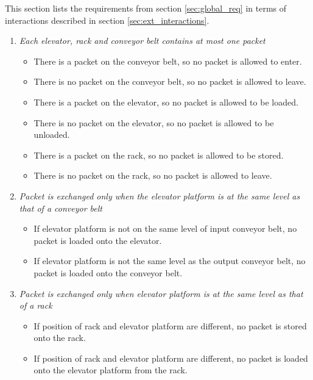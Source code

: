 
This section lists the requirements from section \ref{sec:global_req} in terms of interactions described in section \ref{sec:ext_interactions}.

\begin{enumerate}
\item \textit{Each elevator, rack and conveyor belt contains at most one packet}
	\begin{itemize}
	\item There is a packet on the conveyor belt, so no
	packet is allowed to enter.
	\item There is no packet on the conveyor belt, so no 
	packet is allowed to leave.	
	\item There is a packet on the elevator, so no packet is 
	allowed to be loaded.
	\item There is no packet on the elevator, so no packet is 
	allowed to be unloaded.
	\item There is a packet on the rack, so no packet is 
	allowed to be stored.
	\item There is no packet on the rack, so no packet is 
	allowed to leave.
	\end{itemize}
\item \textit{ Packet is exchanged only when the elevator platform is at the same level as that of a conveyor belt}
	\begin{itemize}
	\item  If elevator platform is not on the same level of input 
	conveyor belt, no packet is loaded onto the elevator.
	\item If elevator platform is not the same level as the output 
	conveyor belt, no packet is loaded onto the conveyor belt.
	\end{itemize}

\item \textit{Packet is exchanged only when elevator platform is at the same level as that of a rack}
	\begin{itemize}
	\item  If position of rack and elevator platform are different, no
	packet is stored onto the rack.
	\item  If position of rack and elevator platform are different, no
	packet is loaded onto the elevator platform from the rack.
	\end{itemize}


\end{enumerate}
